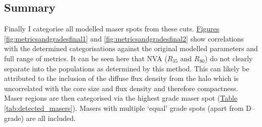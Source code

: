 	\subsection{Summary}
        Finally I categorise all modelled maser spots from these cuts. \hyperref[fig:metricsandgradesfinal1]{Figures \ref*{fig:metricsandgradesfinal1}} and \hyperref[fig:metricsandgradesfinal1]{\ref*{fig:metricsandgradesfinal2}} show correlations with the determined categorisations against the original modelled parameters and full range of metrics. It can be seen here that NVA ($R_{35}$ and $R_{80}$) do not clearly separate into the populations as determined by this method. This can likely be attributed to the inclusion of the diffuse flux density from the halo which is uncorrelated with the core size and flux density and therefore compactness. Maser regions are then categorised via the highest grade maser spot (\hyperref[tab:detected_masers]{Table \ref*{tab:detected_masers}}). Masers with multiple `equal' grade spots (apart from D--grade) are all included.
